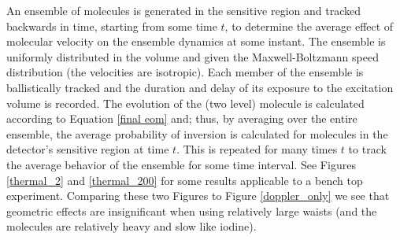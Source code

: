 

An ensemble of molecules is generated in the sensitive region and tracked backwards in time, starting from some time $t$, to determine the average effect of molecular velocity on the ensemble dynamics at some instant. The ensemble is uniformly distributed in the volume and given the Maxwell-Boltzmann speed distribution (the velocities are isotropic). Each member of the ensemble is ballistically tracked and the duration and delay of its exposure to the excitation volume is recorded. The evolution of the (two level) molecule is calculated according to Equation \ref{final eom} and; thus, by averaging over the entire ensemble, the average probability of inversion is calculated for molecules in the detector's sensitive region at time $t$. This is repeated for many times $t$ to track the average behavior of the ensemble for some time interval. See Figures \ref{thermal_2} and \ref{thermal_200} for some results applicable to a bench top experiment. Comparing these two Figures to Figure \ref{doppler_only} we see that geometric effects are insignificant when using relatively large waists (and the molecules are relatively heavy and slow like iodine).


